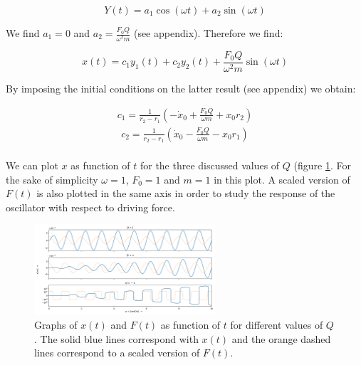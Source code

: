 \begin{equation*}
	Y(t) = a_1 \cos(\omega t) + a_2 \sin(\omega t)
\end{equation*}

We find $a_1 = 0$ and $a_2 = \frac{F_0 Q}{\omega^2 m}$ (see appendix). Therefore we find:

\begin{equation*}
	x(t) = c_1 y_1(t) + c_2 y_2(t) + \frac{F_0 Q}{\omega^2 m}\sin(\omega t)
\end{equation*}

By imposing the initial conditions on the latter result (see appendix) we obtain:

\begin{align*}
	c_1 = \frac{1}{r_2-r_1} \left( -\dot{x}_0 + \frac{F_0 Q}{\omega m} + x_0 r_2 \right)
\end{align*}
\begin{align*}
	c_2 = \frac{1}{r_2-r_1} \left( \dot{x}_0 - \frac{F_0 Q}{\omega m} - x_0 r_1 \right) \\
\end{align*}

We can plot $x$ as function of $t$ for the three discussed values of $Q$ (figure \ref{fig_q1}. For the sake of simplicity $\omega = 1$, $F_0 = 1$ and $m = 1$ in this plot. A scaled version of $F(t)$ is also plotted in the same axis in order to study the response of the oscillator with respect to driving force.
\clearpage

\begin{figure}[h!]
	\centering
	\includegraphics[width=0.6\textwidth]{figures/graph_q1.png}
	\caption{Graphs of $x(t)$ and $F(t)$  as function of $t$ for different values of $Q$. The solid blue lines correspond with $x(t)$ and the orange dashed lines correspond to a scaled version of $F(t)$.}
	\label{fig_q1}
\end{figure}

